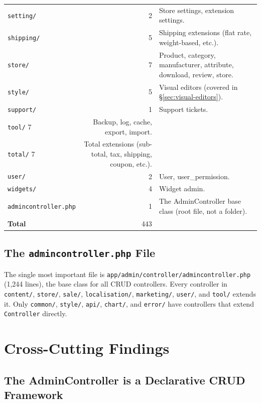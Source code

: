 \documentclass[11pt,a4paper]{article}
\begin{document}
\begin{table}[htbp]
\begin{tabularx}{\columnwidth}{lrX}
\texttt{setting/}       & 2   & Store settings, extension settings. \\
\texttt{shipping/}      & 5   & Shipping extensions (flat rate, weight-based, etc.). \\
\texttt{store/}         & 7   & Product, category, manufacturer, attribute, download, review, store. \\
\texttt{style/}         & 5   & Visual editors (covered in \S\ref{sec:visual-editors}). \\
\texttt{support/}       & 1   & Support tickets. \\
\texttt{tool/}           7   & Backup, log, cache, export, import. \\
\texttt{total/}          7   & Total extensions (sub-total, tax, shipping, coupon, etc.). \\
\texttt{user/}          & 2   & User, user\_permission. \\
\texttt{widgets/}       & 4   & Widget admin. \\
\midrule
\texttt{admincontroller.php} & 1   & The AdminController base class (root file, not a folder). \\
\midrule
\textbf{Total}          & 443 & \\
\bottomrule
\end{tabularx}
\end{table}

\subsection{The \texttt{admincontroller.php} File}

The single most important file is
\texttt{app/admin/controller/admincontroller.php} (1,244 lines), the
base class for all CRUD controllers. Every controller in
\texttt{content/}, \texttt{store/}, \texttt{sale/},
\texttt{localisation/}, \texttt{marketing/}, \texttt{user/}, and
\texttt{tool/} extends it. Only \texttt{common/},
\texttt{style/}, \texttt{api/}, \texttt{chart/}, and
\texttt{error/} have controllers that extend \texttt{Controller}
directly.

\section{Cross-Cutting Findings}\label{sec:findings}

\subsection{The AdminController is a Declarative CRUD Framework}
\end{document}
